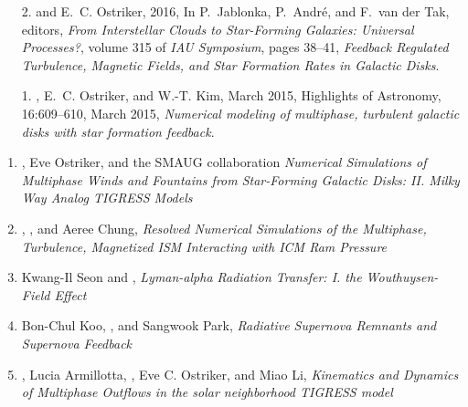 \documentclass[12pt,preprint,letterpaper]{aastex62}
\begin{document}

\begin{itemize}
    
\end{itemize}

\begin{itemize}
    
\end{itemize}

%
%



\begin{itemize}
\item[2.] \boldname{} and E.~C. {Ostriker}, 2016, In P.~{Jablonka},
  P.~{Andr{\'e}}, and F.~{van der Tak}, editors, {\em From Interstellar Clouds
  to Star-Forming Galaxies: Universal Processes?}, volume 315 of {\em IAU
  Symposium}, pages 38--41, \emph{{Feedback Regulated Turbulence, Magnetic
  Fields, and Star Formation Rates in Galactic Disks}}.
\item[1.] \boldname{}, E.~C. {Ostriker}, and W.-T. {Kim}, March 2015,
  Highlights of Astronomy, 16:609--610, March 2015, \emph{{Numerical modeling
  of multiphase, turbulent galactic disks with star formation feedback}}.
\end{itemize}

\begin{enumerate}
\item \boldname{}, Eve Ostriker, and the SMAUG collaboration \emph{Numerical Simulations of Multiphase Winds and Fountains from Star-Forming Galactic Disks: II.  Milky Way Analog {\it TIGRESS} Models}
\item {}, \boldname{}, and Aeree Chung, \emph{Resolved Numerical Simulations of the Multiphase, Turbulence, Magnetized ISM Interacting with ICM Ram Pressure}
\item Kwang-Il Seon and \boldname{}, \emph{Lyman-alpha Radiation Transfer: I. the Wouthuysen-Field Effect}
\item Bon-Chul Koo, \boldname{}, and Sangwook Park, \emph{Radiative Supernova Remnants and Supernova Feedback}
\item {}, Lucia Armillotta, \boldname{}, Eve C. Ostriker, and Miao Li, \emph{Kinematics and Dynamics of Multiphase Outflows in the solar neighborhood TIGRESS model}
\end{enumerate}
\end{document}
